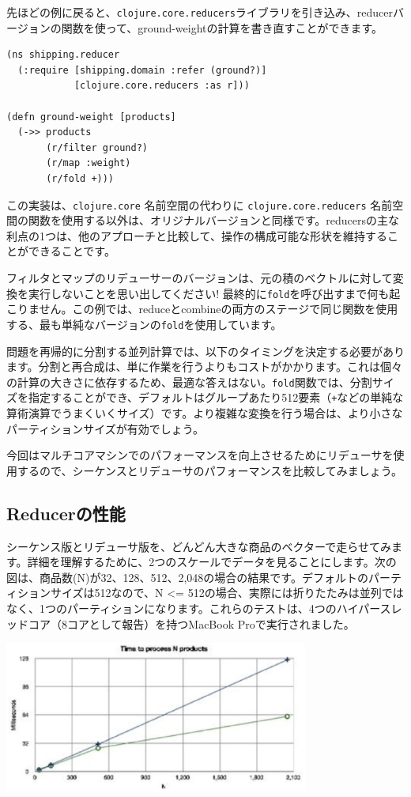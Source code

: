 先ほどの例に戻ると、\texttt{clojure.core.reducers}ライブラリを引き込み、reducerバージョンの関数を使って、ground-weightの計算を書き直すことができます。

\begin{lstlisting}[numbers=none]
(ns shipping.reducer
  (:require [shipping.domain :refer (ground?)]
            [clojure.core.reducers :as r]))

(defn ground-weight [products]
  (->> products
       (r/filter ground?)
       (r/map :weight)
       (r/fold +)))
\end{lstlisting}

この実装は、\texttt{clojure.core} 名前空間の代わりに \texttt{clojure.core.reducers} 名前空間の関数を使用する以外は、オリジナルバージョンと同様です。reducersの主な利点の1つは、他のアプローチと比較して、操作の構成可能な形状を維持することができることです。

フィルタとマップのリデューサーのバージョンは、元の積のベクトルに対して変換を実行しないことを思い出してください! 最終的に\texttt{fold}を呼び出すまで何も起こりません。この例では、reduceとcombineの両方のステージで同じ関数を使用する、最も単純なバージョンの\texttt{fold}を使用しています。

問題を再帰的に分割する並列計算では、以下のタイミングを決定する必要があります。分割と再合成は、単に作業を行うよりもコストがかかります。これは個々の計算の大きさに依存するため、最適な答えはない。\texttt{fold}関数では、分割サイズを指定することができ、デフォルトはグループあたり512要素（\texttt{+}などの単純な算術演算でうまくいくサイズ）です。より複雑な変換を行う場合は、より小さなパーティションサイズが有効でしょう。

今回はマルチコアマシンでのパフォーマンスを向上させるためにリデューサを使用するので、シーケンスとリデューサのパフォーマンスを比較してみましょう。

\subsection{Reducerの性能}

シーケンス版とリデューサ版を、どんどん大きな商品のベクターで走らせてみます。詳細を理解するために、2つのスケールでデータを見ることにします。次の図は、商品数(N)が32、128、512、2,048の場合の結果です。デフォルトのパーティションサイズは512なので、N <= 512の場合、実際には折りたたみは並列ではなく、1つのパーティションになります。これらのテストは、4つのハイパースレッドコア（8コアとして報告）を持つMacBook Proで実行されました。

\includegraphics[width=10cm]{fig_05_006.eps}

